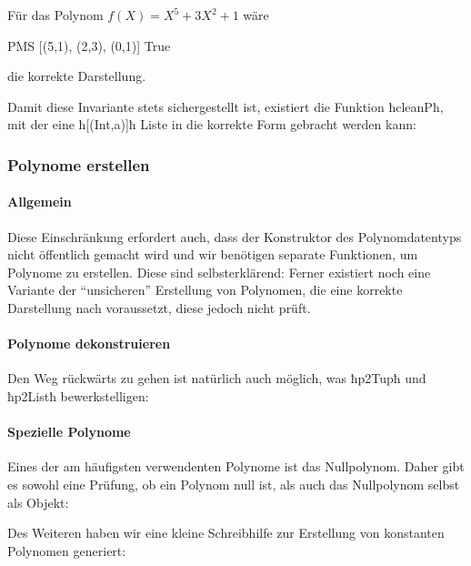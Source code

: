 \begin{beispiel}
  Für das Polynom $f(X) = X^5 + 3X^2 + 1$ wäre 
  \begin{hcode}
    PMS [(5,1), (2,3), (0,1)] True
  \end{hcode}
  die korrekte Darstellung.
\end{beispiel}

Damit diese Invariante stets sichergestellt ist, existiert die Funktion
ħcleanPħ, mit der eine ħ[(Int,a)]ħ Liste in die korrekte Form gebracht werden
kann:


\subsubsection{Polynome erstellen}
\paragraph{Allgemein}
Diese Einschränkung erfordert auch, dass der Konstruktor des Polynomdatentyps
nicht öffentlich gemacht wird und wir benötigen separate Funktionen, um
Polynome zu erstellen. Diese sind selbsterklärend:
Ferner existiert noch eine Variante der ``unsicheren'' Erstellung von
Polynomen, die eine korrekte Darstellung nach  voraussetzt,
diese jedoch nicht prüft. 


\paragraph{Polynome dekonstruieren}
Den Weg rückwärts zu gehen ist natürlich auch möglich, was ħp2Tupħ und ħp2Listħ
bewerkstelligen:



\paragraph{Spezielle Polynome}
Eines der am häufigsten verwendenten Polynome ist das Nullpolynom. Daher gibt
es sowohl eine Prüfung, ob ein Polynom null ist, als auch das Nullpolynom
selbst als Objekt:


Des Weiteren haben wir eine kleine Schreibhilfe zur Erstellung von konstanten
Polynomen generiert:

